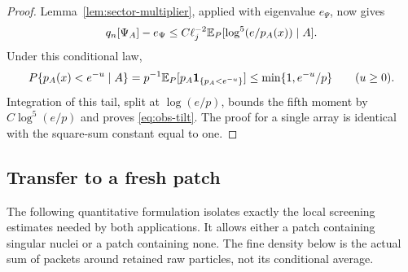 \begin{proof}
Lemma~\ref{lem:sector-multiplier}, applied with eigenvalue $e_\Psi$,
now gives
\[
 q_n[\Psi_A]-e_\Psi
    \le C\ell_j^{-2}\mathbb E_P[\log^5(e/p_A(x))\mid A].
\]
Under this conditional law,
\[
 P\{p_A(x)<e^{-u}\mid A\}
   =p^{-1}\mathbb E_P[p_A\mathbf 1_{\{p_A<e^{-u}\}}]
   \le\min\{1,e^{-u}/p\}\qquad(u\ge0).
\]
Integration of this tail, split at $\log(e/p)$, bounds the fifth
moment by $C\log^5(e/p)$ and proves \eqref{eq:obs-tilt}.
The proof for a single array is identical with the square-sum
constant equal to one.
\end{proof}

\subsection{Transfer to a fresh patch}

The following quantitative formulation isolates exactly the local
screening estimates needed by both applications. It allows either
a patch containing singular nuclei or a patch containing none.
The fine density below is the actual sum of packets around retained
raw particles, not its conditional average.

